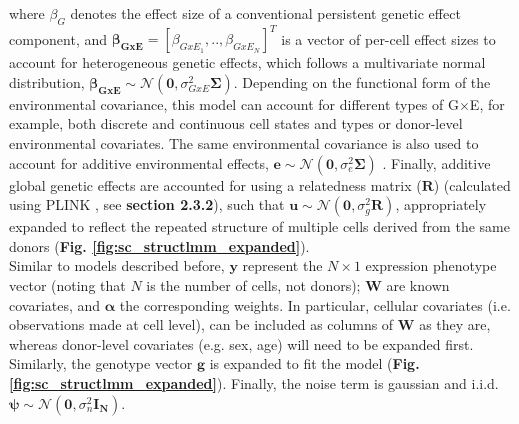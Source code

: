 where $\beta_G$ denotes the effect size of a conventional persistent genetic effect component, and $\boldsymbol{\beta_{GxE}}=[\beta_{GxE_1}, .. ,\beta_{GxE_N}]^T$ is a vector of per-cell effect sizes to account for heterogeneous genetic effects, which follows a multivariate normal distribution, 
$\boldsymbol{\beta_{GxE}} \sim \mathcal{N}(\mathbf{0},\sigma_{GxE}^2 \boldsymbol{\Sigma})$. 
Depending on the functional form of the environmental covariance, this model can account for different types of G$\times$E, for example, both discrete and continuous cell states and types or donor-level environmental covariates. 
The same environmental covariance is also used to account for additive environmental effects, 
$\mathbf{e} \sim \mathcal{N}(\mathbf{0},\sigma_e^2 \boldsymbol{\Sigma})$ 
\cite{moore2019linear}. 
Finally, additive global genetic effects are accounted for using a relatedness matrix ($\mathbf{R}$) (calculated using PLINK \cite{purcell2007plink}, see \textbf{section 
2.3.2}), such that
$\mathbf{u} \sim \mathcal{N}(\mathbf{0},\sigma_g^2 \mathbf{R})$,
appropriately expanded to reflect the repeated structure of multiple cells derived from the same donors (\textbf{Fig. \ref{fig:sc_structlmm_expanded}}). \\

Similar to models described before, $\mathbf{y}$ represent the $N \times 1$ expression phenotype vector (noting that $N$ is the number of cells, not donors); $\mathbf{W}$ are known covariates, and $\boldsymbol{\alpha}$ the corresponding weights.
In particular, cellular covariates (i.e. observations made at cell level), can be included as columns of $\mathbf{W}$ as they are, whereas donor-level covariates (e.g. sex, age) will need to be expanded first.
Similarly, the genotype vector $\mathbf{g}$ is expanded to fit the model (\textbf{Fig. \ref{fig:sc_structlmm_expanded}}).
Finally, the noise term is gaussian and i.i.d. $\boldsymbol{\psi} \sim \mathcal{N}(\mathbf{0},\sigma_n^2 \mathbf{I_N})$.\\

